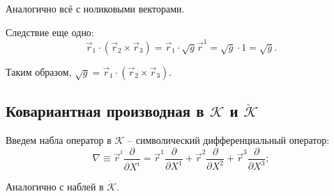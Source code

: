 Аналогично всё с ноликовыми векторами.

Следствие еще одно:
\[
  \vec{r}_1 \cdot (\vec{r}_2 \times \vec{r}_3)
  = \vec{r}_1 \cdot \sqrt{g} \vec{r}^1
  = \sqrt{g} \cdot 1 = \sqrt{g}.
\]

Таким образом, $\sqrt{g} = \vec{r}_1 \cdot (\vec{r}_2 \times \vec{r}_3)$.


\subsection{Ковариантная производная в $\mathcal{K}$ и $\mathring{\mathcal{K}}$}

Введем набла оператор в $\mathcal{K}$ -- символический дифференциальный оператор:
\[
  \nabla \equiv \vec{r}^i \dfrac{\partial }{\partial X^i} 
  = \vec{r}^1 \dfrac{\partial }{\partial X^1} + \vec{r}^2 \dfrac{\partial }{\partial X^2} 
  + \vec{r}^3 \dfrac{\partial }{\partial X^3};
\]

Аналогично с наблей в $\mathring{\mathcal{K}}$.

